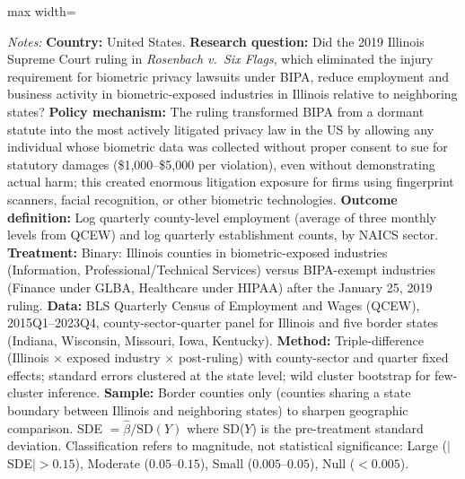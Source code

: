 \begin{table}[H]
\begin{adjustbox}{max width=\textwidth}
\begin{threeparttable}
\begin{tablenotes}[flushleft]
\item \textit{Notes:} \textbf{Country:} United States. \textbf{Research question:} Did the 2019 Illinois Supreme Court ruling in \textit{Rosenbach v.~Six Flags}, which eliminated the injury requirement for biometric privacy lawsuits under BIPA, reduce employment and business activity in biometric-exposed industries in Illinois relative to neighboring states? \textbf{Policy mechanism:} The ruling transformed BIPA from a dormant statute into the most actively litigated privacy law in the US by allowing any individual whose biometric data was collected without proper consent to sue for statutory damages (\$1,000--\$5,000 per violation), even without demonstrating actual harm; this created enormous litigation exposure for firms using fingerprint scanners, facial recognition, or other biometric technologies. \textbf{Outcome definition:} Log quarterly county-level employment (average of three monthly levels from QCEW) and log quarterly establishment counts, by NAICS sector. \textbf{Treatment:} Binary: Illinois counties in biometric-exposed industries (Information, Professional/Technical Services) versus BIPA-exempt industries (Finance under GLBA, Healthcare under HIPAA) after the January 25, 2019 ruling. \textbf{Data:} BLS Quarterly Census of Employment and Wages (QCEW), 2015Q1--2023Q4, county-sector-quarter panel for Illinois and five border states (Indiana, Wisconsin, Missouri, Iowa, Kentucky). \textbf{Method:} Triple-difference (Illinois $\times$ exposed industry $\times$ post-ruling) with county-sector and quarter fixed effects; standard errors clustered at the state level; wild cluster bootstrap for few-cluster inference. \textbf{Sample:} Border counties only (counties sharing a state boundary between Illinois and neighboring states) to sharpen geographic comparison. SDE $= \hat{\beta} / \text{SD}(Y)$ where SD($Y$) is the pre-treatment standard deviation. Classification refers to magnitude, not statistical significance: Large ($|$SDE$| > 0.15$), Moderate ($0.05$--$0.15$), Small ($0.005$--$0.05$), Null ($< 0.005$).
\end{tablenotes}
\end{threeparttable}
\end{adjustbox}
\end{table}

